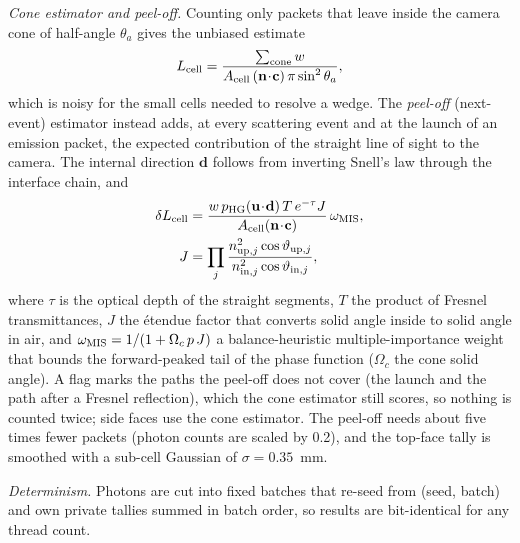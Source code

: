 \documentclass[journal]{IEEEtran}
\begin{document}
\emph{Cone estimator and peel-off.} Counting only packets that leave inside the camera cone of half-angle $\theta_a$ gives the unbiased estimate
\begin{equation}
L_{\rm cell}=\frac{\sum_{\rm cone}w}{A_{\rm cell}\,(\mathbf n\!\cdot\!\mathbf c)\,\pi\sin^2\theta_a},
\label{eq:cone}
\end{equation}
which is noisy for the small cells needed to resolve a wedge. The \emph{peel-off} (next-event) estimator instead adds, at every scattering event and at the launch of an emission packet, the expected contribution of the straight line of sight to the camera. The internal direction $\mathbf d$ follows from inverting Snell's law through the interface chain, and
\begin{equation}
\begin{split}\delta L_{\rm cell}&=\frac{w\,p_{\rm HG}(\mathbf u\!\cdot\!\mathbf d)\,T\,e^{-\tau}J}{A_{\rm cell}(\mathbf n\!\cdot\!\mathbf c)}\,\omega_{\rm MIS},\\ J&=\prod_j\frac{n_{{\rm up},j}^2\cos\vartheta_{{\rm up},j}}{n_{{\rm in},j}^2\cos\vartheta_{{\rm in},j}},\end{split}
\label{eq:peel}
\end{equation}
where $\tau$ is the optical depth of the straight segments, $T$ the product of Fresnel transmittances, $J$ the \'etendue factor that converts solid angle inside to solid angle in air, and $\omega_{\rm MIS}=1/(1+\Omega_c\,p\,J)$ a balance-heuristic multiple-importance weight~\cite{veach1995} that bounds the forward-peaked tail of the phase function ($\Omega_c$ the cone solid angle). A flag marks the paths the peel-off does not cover (the launch and the path after a Fresnel reflection), which the cone estimator still scores, so nothing is counted twice; side faces use the cone estimator. The peel-off needs about five times fewer packets (photon counts are scaled by 0.2), and the top-face tally is smoothed with a sub-cell Gaussian of $\sigma=0.35$~mm.

\emph{Determinism.} Photons are cut into fixed batches that re-seed from (seed, batch) and own private tallies summed in batch order, so results are bit-identical for any thread count.
\end{document}

